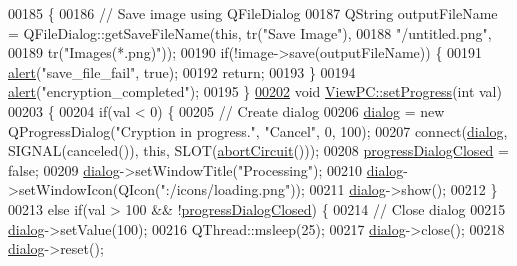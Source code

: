 \begin{DoxyCode}
00185 \{
00186     \textcolor{comment}{// Save image using QFileDialog}
00187     QString outputFileName = QFileDialog::getSaveFileName(\textcolor{keyword}{this}, tr(\textcolor{stringliteral}{"Save Image"}),
00188                                \textcolor{stringliteral}{"/untitled.png"},
00189                                tr(\textcolor{stringliteral}{"Images(*.png)"}));
00190     \textcolor{keywordflow}{if}(!image->save(outputFileName)) \{
00191         \hyperlink{class_view_p_c_a7c467169467789561078abc9d4fe57bd}{alert}(\textcolor{stringliteral}{"save\_file\_fail"}, \textcolor{keyword}{true});
00192         \textcolor{keywordflow}{return};
00193     \}
00194     \hyperlink{class_view_p_c_a7c467169467789561078abc9d4fe57bd}{alert}(\textcolor{stringliteral}{"encryption\_completed"});
00195 \}
\hypertarget{viewpc_8cpp_source.tex_l00202}{}\hyperlink{class_view_p_c_a9c32a1fdb6ead84e5ada8fba8860c7ed}{00202} \textcolor{keywordtype}{void} \hyperlink{class_view_p_c_a9c32a1fdb6ead84e5ada8fba8860c7ed}{ViewPC::setProgress}(\textcolor{keywordtype}{int} val)
00203 \{
00204     \textcolor{keywordflow}{if}(val < 0) \{
00205         \textcolor{comment}{// Create dialog}
00206         \hyperlink{class_view_p_c_a31abbb470fe329b44e6ffee202b903ca}{dialog} = \textcolor{keyword}{new} QProgressDialog(\textcolor{stringliteral}{"Cryption in progress."}, \textcolor{stringliteral}{"Cancel"}, 0, 100);
00207         connect(\hyperlink{class_view_p_c_a31abbb470fe329b44e6ffee202b903ca}{dialog}, SIGNAL(canceled()), \textcolor{keyword}{this}, SLOT(\hyperlink{class_view_p_c_ad7ba2fcf1d17862de15e32432823f7b0}{abortCircuit}()));
00208         \hyperlink{class_view_p_c_add8c82aa2b0b934212aa5bde9277ab36}{progressDialogClosed} = \textcolor{keyword}{false};
00209         \hyperlink{class_view_p_c_a31abbb470fe329b44e6ffee202b903ca}{dialog}->setWindowTitle(\textcolor{stringliteral}{"Processing"});
00210         \hyperlink{class_view_p_c_a31abbb470fe329b44e6ffee202b903ca}{dialog}->setWindowIcon(QIcon(\textcolor{stringliteral}{":/icons/loading.png"}));
00211         \hyperlink{class_view_p_c_a31abbb470fe329b44e6ffee202b903ca}{dialog}->show();
00212     \}
00213     \textcolor{keywordflow}{else} \textcolor{keywordflow}{if}(val > 100 && !\hyperlink{class_view_p_c_add8c82aa2b0b934212aa5bde9277ab36}{progressDialogClosed}) \{
00214         \textcolor{comment}{// Close dialog}
00215         \hyperlink{class_view_p_c_a31abbb470fe329b44e6ffee202b903ca}{dialog}->setValue(100);
00216         QThread::msleep(25);
00217         \hyperlink{class_view_p_c_a31abbb470fe329b44e6ffee202b903ca}{dialog}->close();
00218         \hyperlink{class_view_p_c_a31abbb470fe329b44e6ffee202b903ca}{dialog}->reset();

\end{DoxyCode}
